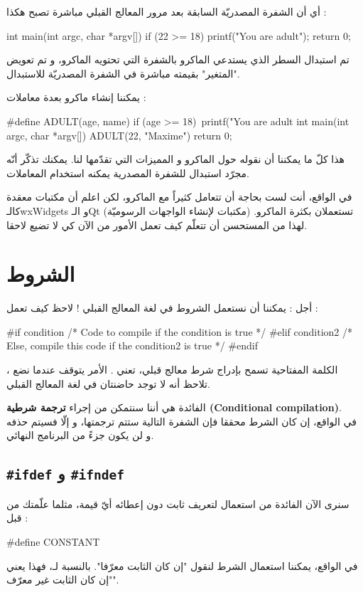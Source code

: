 أي أن الشفرة المصدريّة السابقة بعد مرور المعالج القبلي مباشرة تصبح هكذا :
\begin{Csource}
int main(int argc, char *argv[])
{
	if (22 >= 18)
		printf("You are adult\n");
	return 0;
}
\end{Csource}
تم استبدال السطر الذي يستدعي الماكرو بالشفرة التي تحتويه الماكرو، و تم تعويض "المتغير"
بقيمته مباشرة في الشفرة المصدريّة للاستبدال.

يمكننا إنشاء ماكرو بعدة معاملات :
\begin{Csource}
#define ADULT(age, name) if (age >= 18)\
			printf("You are adult %
int main(int argc, char *argv[])
{
	ADULT(22, "Maxime")
	return 0;
}
\end{Csource}
هذا كلّ ما يمكننا أن نقوله حول الماكرو و المميزات التي تقدّمها لنا. يمكنك تذكّر أنّه مجرّد استبدال للشفرة المصدرية يمكنه استخدام المعاملات.
\begin{information}
في الواقع، أنت لست بحاجة أن تتعامل كثيراً مع الماكرو، لكن اعلم أن مكتبات معقدة كالـ\textenglish{wxWidgets}
و الـ\textenglish{Qt}
(مكتبات لإنشاء الواجهات الرسوميّة) تستعملان بكثرة الماكرو. لهذا من المستحسن أن تتعلّم كيف تعمل الأمور من الآن كي لا تضيع لاحقا.
\end{information}

\section{الشروط}
أجل : يمكننا أن نستعمل الشروط في لغة المعالج القبلي ! لاحظ كيف تعمل :
\begin{Csource}
#if condition
  /* Code to compile if the condition is true */
#elif condition2
  /* Else, compile this code if the condition2 is true */
#endif
\end{Csource}
الكلمة المفتاحية
تسمح بإدراج شرط معالج قبلي،
تعني
.
الأمر يتوقف عندما نضع
،
تلاحظ أنه لا توجد حاضنتان في لغة المعالج القبلي.

الفائدة هي أننا سنتمكن من إجراء
\textbf{ترجمة شرطية
(\textenglish{Conditional compilation})}.\\
في الواقع، إن كان الشرط محققا فإن الشفرة التالية ستتم ترجمتها، و إلّا فسيتم حذفه و لن يكون جزءً من البرنامج النهائي.

\subsection{
\texttt{\#ifdef}
و
\texttt{\#ifndef}
}
سنرى الآن الفائدة من استعمال
لتعريف ثابت دون إعطائه أيّ قيمة، مثلما علّمتك من قبل :
\begin{Csource}
#define CONSTANT
\end{Csource}
في الواقع، يمكننا استعمال الشرط
لنقول "إن كان الثابت معرّفا".
بالنسبة لـ،
فهذا يعني "إن كان الثابت غير معرّف".

